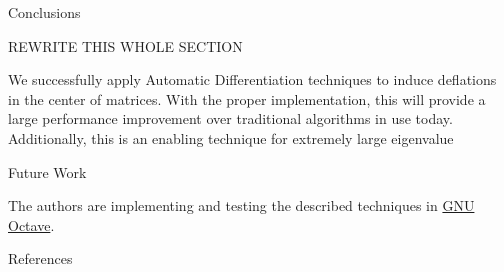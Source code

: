 \documentclass[final]{beamer}
\newlength{\onecolwid}
\begin{document}
\begin{frame}[t]
\begin{columns}[t]
\begin{column}{\onecolwid} %


\begin{block}{Conclusions}

REWRITE THIS WHOLE SECTION

We successfully apply Automatic Differentiation techniques to induce deflations
in the center of matrices. With the proper implementation, this will provide a
large performance improvement over traditional algorithms in use today.
Additionally, this is an enabling technique for extremely large eigenvalue

\end{block}


\begin{block}{Future Work}

The authors are implementing and testing the described techniques in
\href{http://octave.org/}{GNU Octave}.

\end{block}


\begin{block}{References}

\small{
\vspace{0.75in}}

\end{block}



\end{column}
\end{columns}
\end{frame}
\end{document}
